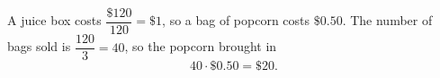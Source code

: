 A juice box costs $\dfrac{\$120}{120}=\$1$, so a bag of popcorn costs $\$0.50$. The number of bags sold is $\dfrac{120}{3}=40$, so the popcorn brought in
\[
40\cdot\$0.50=\boxed{\$20}.
\]
